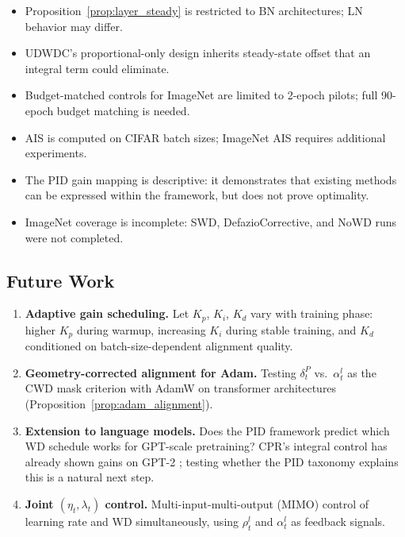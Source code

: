 \documentclass{article}
\begin{document}
\begin{itemize}
\item Proposition~\ref{prop:layer_steady} is restricted to BN architectures; LN behavior may differ.
\item UDWDC's proportional-only design inherits steady-state offset that an integral term could eliminate.
\item Budget-matched controls for ImageNet are limited to 2-epoch pilots; full 90-epoch budget matching is needed.
\item AIS is computed on CIFAR batch sizes; ImageNet AIS requires additional experiments.
\item The PID gain mapping is descriptive: it demonstrates that existing methods can be expressed within the framework, but does not prove optimality.
\item ImageNet coverage is incomplete: SWD, DefazioCorrective, and NoWD runs were not completed.
\end{itemize}

\subsection{Future Work}

\begin{enumerate}
\item \textbf{Adaptive gain scheduling.} Let $K_p$, $K_i$, $K_d$ vary with training phase: higher $K_p$ during warmup, increasing $K_i$ during stable training, and $K_d$ conditioned on batch-size-dependent alignment quality.

\item \textbf{Geometry-corrected alignment for Adam.} Testing $\delta_t^P$ vs.\ $\alpha_t^l$ as the CWD mask criterion with AdamW on transformer architectures (Proposition~\ref{prop:adam_alignment}).

\item \textbf{Extension to language models.} Does the PID framework predict which WD schedule works for GPT-scale pretraining? CPR's integral control has already shown gains on GPT-2 \citep{franke2024cpr}; testing whether the PID taxonomy explains this is a natural next step.

\item \textbf{Joint $(\eta_t, \lambda_t)$ control.} Multi-input-multi-output (MIMO) control of learning rate and WD simultaneously, using $\rho_t^l$ and $\alpha_t^l$ as feedback signals.
\end{enumerate}
\end{document}
